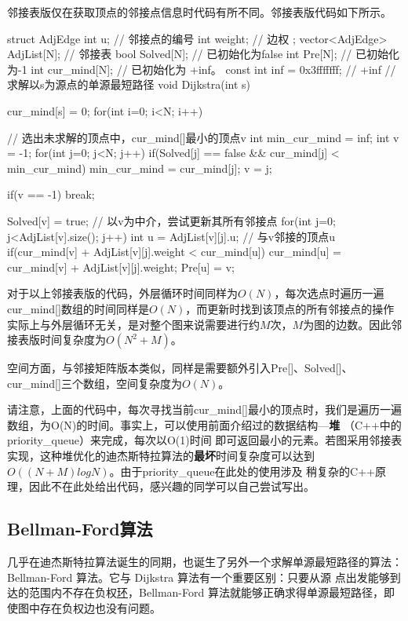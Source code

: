 邻接表版仅在获取顶点的邻接点信息时代码有所不同。邻接表版代码如下所示。
\begin{cppcodeHighlight}[1-5,30-36]
    struct AdjEdge {
        int u;      // 邻接点的编号
        int weight; // 边权
    };
    vector<AdjEdge> AdjList[N];    // 邻接表
    bool Solved[N];     // 已初始化为false
    int Pre[N];         // 已初始化为-1
    int cur_mind[N];    // 已初始化为 +inf。
    const int inf = 0x3fffffff; // +inf
    // 求解以s为源点的单源最短路径
    void Dijkstra(int s) {
        cur_mind[s] = 0;
        for(int i=0; i<N; i++) {
            // 选出未求解的顶点中，cur_mind[]最小的顶点v
            int min_cur_mind = inf;
            int v = -1;
            for(int j=0; j<N; j++) {
                if(Solved[j] == false && cur_mind[j] < min_cur_mind) {
                    min_cur_mind = cur_mind[j];
                    v = j;
                }
            }

            if(v == -1) {
                break;
            }
            
            Solved[v] = true;
            // 以v为中介，尝试更新其所有邻接点
            for(int j=0; j<AdjList[v].size(); j++) {
                int u = AdjList[v][j].u;  // 与v邻接的顶点u
                if(cur_mind[v] + AdjList[v][j].weight < cur_mind[u]) {
                    cur_mind[u] = cur_mind[v] + AdjList[v][j].weight;
                    Pre[u] = v;
                }
            }
        } 
    }
\end{cppcodeHighlight}
对于以上邻接表版的代码，外层循环时间同样为$O(N)$，每次选点时遍历一遍cur\_mind[]数组的时间同样是$O(N)$，而更新时找到该顶点的所有邻接点的操作
实际上与外层循环无关，是对整个图来说需要进行约$M$次，$M$为图的边数。因此邻接表版时间复杂度为$O(N^2+M)$。

空间方面，与邻接矩阵版本类似，同样是需要额外引入Pre[]、Solved[]、cur\_mind[]三个数组，空间复杂度为$O(N)$。

请注意，上面的代码中，每次寻找当前cur\_mind[]最小的顶点时，我们是遍历一遍数组，为O(N)的时间。事实上，可以使用前面介绍过的数据结构---\textbf{堆}
（C++中的priority\_queue）来完成，每次以O(1)时间
即可返回最小的元素。若图采用邻接表实现，这种堆优化的迪杰斯特拉算法的\textbf{最坏}时间复杂度可以达到$O((N+M)logN)$。由于priority\_queue在此处的使用涉及
稍复杂的C++原理，因此不在此处给出代码，感兴趣的同学可以自己尝试写出。



\subsection{Bellman-Ford算法}
几乎在迪杰斯特拉算法诞生的同期，也诞生了另外一个求解单源最短路径的算法：Bellman-Ford 算法。它与 Dijkstra 算法有一个重要区别：只要从源
点出发能够到达的范围内不存在负权\uline{环}，Bellman-Ford 算法就能够正确求得单源最短路径，即使图中存在负权边也没有问题。\\

